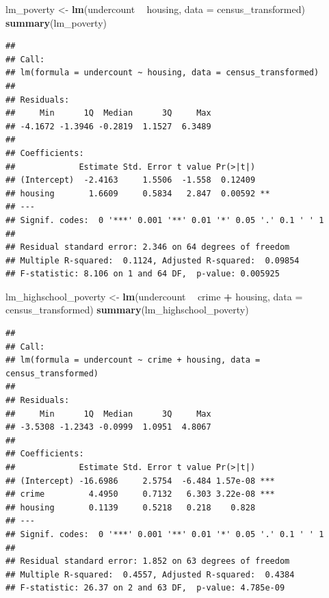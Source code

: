 \documentclass[landscape]{article}
\newenvironment{Shaded}{\begin{snugshade}}{\end{snugshade}}
\newcommand{\KeywordTok}[1]{\textcolor[rgb]{0.13,0.29,0.53}{\textbf{#1}}}
\newcommand{\DataTypeTok}[1]{\textcolor[rgb]{0.13,0.29,0.53}{#1}}
\newcommand{\StringTok}[1]{\textcolor[rgb]{0.31,0.60,0.02}{#1}}
\newcommand{\OperatorTok}[1]{\textcolor[rgb]{0.81,0.36,0.00}{\textbf{#1}}}
\newcommand{\NormalTok}[1]{#1}
\begin{document}
\begin{Shaded}
\begin{Highlighting}[]
\NormalTok{lm_poverty <-}\StringTok{ }\KeywordTok{lm}\NormalTok{(undercount }\OperatorTok{~}\StringTok{ }\NormalTok{housing, }\DataTypeTok{data =}\NormalTok{ census_transformed)}
\KeywordTok{summary}\NormalTok{(lm_poverty)}
\end{Highlighting}
\end{Shaded}

\begin{verbatim}
## 
## Call:
## lm(formula = undercount ~ housing, data = census_transformed)
## 
## Residuals:
##     Min      1Q  Median      3Q     Max 
## -4.1672 -1.3946 -0.2819  1.1527  6.3489 
## 
## Coefficients:
##             Estimate Std. Error t value Pr(>|t|)   
## (Intercept)  -2.4163     1.5506  -1.558  0.12409   
## housing       1.6609     0.5834   2.847  0.00592 **
## ---
## Signif. codes:  0 '***' 0.001 '**' 0.01 '*' 0.05 '.' 0.1 ' ' 1
## 
## Residual standard error: 2.346 on 64 degrees of freedom
## Multiple R-squared:  0.1124, Adjusted R-squared:  0.09854 
## F-statistic: 8.106 on 1 and 64 DF,  p-value: 0.005925
\end{verbatim}

\begin{Shaded}
\begin{Highlighting}[]
\NormalTok{lm_highschool_poverty <-}\StringTok{ }\KeywordTok{lm}\NormalTok{(undercount }\OperatorTok{~}\StringTok{ }\NormalTok{crime }\OperatorTok{+}\StringTok{ }\NormalTok{housing, }\DataTypeTok{data =}\NormalTok{ census_transformed)}
\KeywordTok{summary}\NormalTok{(lm_highschool_poverty)}
\end{Highlighting}
\end{Shaded}

\begin{verbatim}
## 
## Call:
## lm(formula = undercount ~ crime + housing, data = census_transformed)
## 
## Residuals:
##     Min      1Q  Median      3Q     Max 
## -3.5308 -1.2343 -0.0999  1.0951  4.8067 
## 
## Coefficients:
##             Estimate Std. Error t value Pr(>|t|)    
## (Intercept) -16.6986     2.5754  -6.484 1.57e-08 ***
## crime         4.4950     0.7132   6.303 3.22e-08 ***
## housing       0.1139     0.5218   0.218    0.828    
## ---
## Signif. codes:  0 '***' 0.001 '**' 0.01 '*' 0.05 '.' 0.1 ' ' 1
## 
## Residual standard error: 1.852 on 63 degrees of freedom
## Multiple R-squared:  0.4557, Adjusted R-squared:  0.4384 
## F-statistic: 26.37 on 2 and 63 DF,  p-value: 4.785e-09
\end{verbatim}
\end{document}
